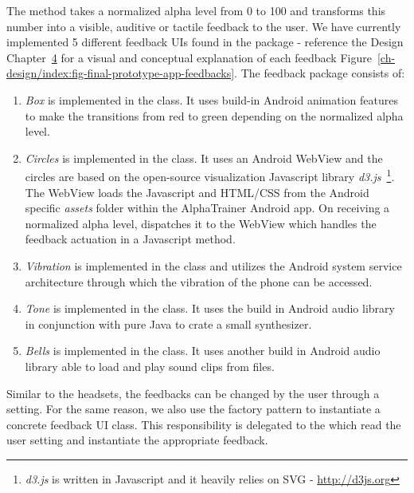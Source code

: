\documentclass[a4paper,10pt,english,lof,lot,twoside]{puthesis}
\begin{document}
The  method takes a normalized alpha level from 0 to 100 and
transforms this number into a visible, auditive or tactile feedback to the user.
We have currently implemented 5 different feedback UIs found in the
 package - reference the Design Chapter {\hyperref[ch-design/index:ch-design]{4}} for a visual and conceptual explanation of each feedback
Figure \ref{ch-design/index:fig-final-prototype-app-feedbacks}. The feedback package
consists of:
\begin{enumerate}
\item {} 
\emph{Box} is implemented in the  class. It uses build-in Android
animation features to make the transitions from red to green depending on the
normalized alpha level.

\item {} 
\emph{Circles} is implemented in the  class. It uses an
Android WebView and the circles are based on the open-source visualization
Javascript library \emph{d3.js} \footnote{
\emph{d3.js} is written in Javascript and it heavily relies on SVG - \href{http://d3js.org}{http://d3js.org}
}. The WebView
loads the Javascript and HTML/CSS from the Android specific \emph{assets} folder
within the AlphaTrainer Android app.
On receiving a normalized alpha level,  dispatches it
to the WebView which handles the feedback actuation in a Javascript method.

\item {} 
\emph{Vibration} is implemented in the  class and utilizes the
Android system service architecture through which the vibration of the phone
can be accessed.

\item {} 
\emph{Tone} is implemented in the  class. It uses the build
in Android audio library in conjunction with pure Java to crate a small
synthesizer.

\item {} 
\emph{Bells} is implemented in the  class. It uses another
build in Android audio library able to load and play sound clips from files.

\end{enumerate}

Similar to the headsets, the feedbacks can be changed by the user through a setting.
For the same reason, we also use the factory pattern to
instantiate a concrete feedback UI class. This responsibility is delegated
to the  which read the user setting and instantiate the
appropriate feedback.
\end{document}

